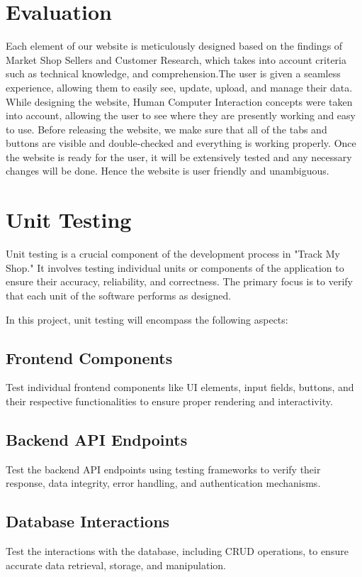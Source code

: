 \section{Evaluation}
Each element of our website is meticulously designed based on the findings of Market Shop Sellers and Customer Research, which takes into account criteria such as technical knowledge, and comprehension.The user is given a seamless experience, allowing them to easily see, update, upload, and manage their data. While designing the website, Human Computer Interaction concepts were taken into account, allowing the user to see where they are presently working and easy to use. Before releasing the website, we make sure that all of the tabs and buttons are visible and double-checked and everything is working properly. Once the website is ready for the user, it will be extensively tested and any necessary changes will be done. Hence the website is user friendly and unambiguous.

\section{Unit Testing}

Unit testing is a crucial component of the development process in "Track My Shop." It involves testing individual units or components of the application to ensure their accuracy, reliability, and correctness. The primary focus is to verify that each unit of the software performs as designed.

In this project, unit testing will encompass the following aspects:

\subsection{Frontend Components} Test individual frontend components like UI elements, input fields, buttons, and their respective functionalities to ensure proper rendering and interactivity.
	
\subsection{Backend API Endpoints} Test the backend API endpoints using testing frameworks to verify their response, data integrity, error handling, and authentication mechanisms.
	
\subsection{Database Interactions} Test the interactions with the database, including CRUD operations, to ensure accurate data retrieval, storage, and manipulation.
	
